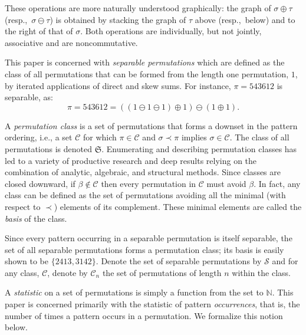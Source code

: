 \documentclass[10pt]{article}
\theoremstyle{definition}
\numberwithin{equation}{section}
\numberwithin{figure}{section}
\begin{document}
These operations are more naturally understood graphically: the graph of $\sigma \oplus \tau$  (resp.,~$\sigma \ominus \tau$) is obtained by stacking the graph of $\tau$ above (resp.,~below) and to the right of that of $\sigma$. Both operations are individually, but not jointly, associative and are noncommutative. 

This paper is concerned with \emph{separable permutations} which are defined as the class of all permutations that can be formed from the length one permutation, $1$, by iterated applications of direct and skew sums.
For instance, $\pi = 543612$ is separable, as: 
\[
\pi = 543612 = ((1 \ominus 1 \ominus 1) \oplus 1)\ominus (1 \oplus 1).
\]


A \emph{permutation class} is a set of permutations that forms a downset in the pattern ordering, i.e., a set $\mathcal{C}$ for which $\pi \in \mathcal{C}$ and $\sigma \prec \pi$ implies $\sigma \in \mathcal{C}$.  The class of all permutations is denoted $\mathfrak{S}$. Enumerating and describing permutation classes has led to a variety of productive research and deep results relying on the combination of analytic, algebraic, and structural methods. Since classes are closed downward, if $\beta \not \in \mathcal{C}$ then every permutation in $\mathcal{C}$ must avoid $\beta$. In fact, any class can be defined as the set of permutations avoiding all the minimal (with respect to $\prec$) elements of its complement. These minimal elements are called the \emph{basis} of the class.
  
Since every pattern occurring in a separable permutation is itself separable, the set of all separable permutations forms a permutation class; its basis is easily shown to be $\{2413,3142\}$.  Denote the set of separable permutations by $\mathcal{S}$ and for any class, $\mathcal{C}$, denote by $\mathcal{C}_n$ the set of permutations of length $n$ within the class. 

A \emph{statistic} on a set of permutations is simply a function from the set to $\mathbb{N}$. This paper is concerned primarily with the statistic of pattern \emph{occurrences}, that is, the number of times a pattern occurs in a permutation. We formalize this notion below. 
\end{document}
